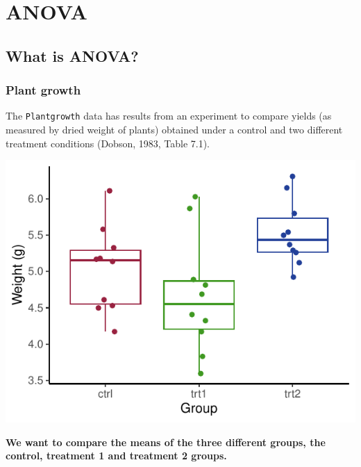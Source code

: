 \documentclass[a4paper]{article}
\begin{document}
\section{ANOVA}\label{sec:20}
\subsection{What is ANOVA?}
\subsubsection{Plant growth}
The \lstinline|Plantgrowth| data has results from an experiment to compare yields (as measured by dried weight of plants) obtained under a control and two different treatment conditions (Dobson, 1983, Table 7.1).
\begin{Schunk}


{\centering \includegraphics[width=\maxwidth]{figure/listings-unnamed-chunk-221-1} 

}

\end{Schunk}
\begin{greenbox}
	\textbf{We want to compare the means of the three different groups, the control, treatment 1 and treatment 2 groups.}
\end{greenbox}
\end{document}
